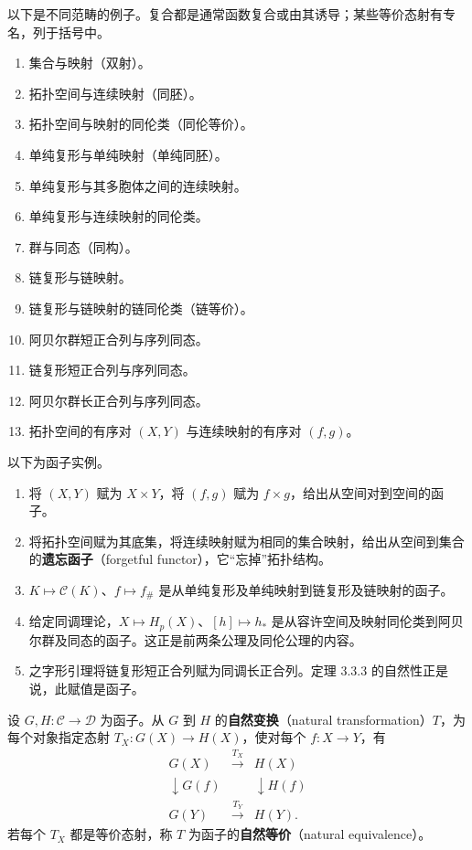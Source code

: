 以下是不同范畴的例子。复合都是通常函数复合或由其诱导；某些等价态射有专名，列于括号中。
\begin{enumerate}[label=(\alph*)]
\item 集合与映射（双射）。
\item 拓扑空间与连续映射（同胚）。
\item 拓扑空间与映射的同伦类（同伦等价）。
\item 单纯复形与单纯映射（单纯同胚）。
\item 单纯复形与其多胞体之间的连续映射。
\item 单纯复形与连续映射的同伦类。
\item 群与同态（同构）。
\item 链复形与链映射。
\item 链复形与链映射的链同伦类（链等价）。
\item 阿贝尔群短正合列与序列同态。
\item 链复形短正合列与序列同态。
\item 阿贝尔群长正合列与序列同态。
\item 拓扑空间的有序对 $(X,Y)$ 与连续映射的有序对 $(f,g)$。
\end{enumerate}

以下为函子实例。
\begin{enumerate}[label=(\alph*)]
\item 将 $(X,Y)$ 赋为 $X\times Y$，将 $(f,g)$ 赋为 $f\times g$，给出从空间对到空间的函子。
\item 将拓扑空间赋为其底集，将连续映射赋为相同的集合映射，给出从空间到集合的\textbf{遗忘函子}（forgetful functor），它“忘掉”拓扑结构。
\item $K\mapsto\mathcal C(K)$、$f\mapsto f_\#$ 是从单纯复形及单纯映射到链复形及链映射的函子。
\item 给定同调理论，$X\mapsto H_p(X)$、$[h]\mapsto h_*$ 是从容许空间及映射同伦类到阿贝尔群及同态的函子。这正是前两条公理及同伦公理的内容。
\item 之字形引理将链复形短正合列赋为同调长正合列。定理 3.3.3 的自然性正是说，此赋值是函子。
\end{enumerate}

设 $G,H:\mathcal C\to\mathcal D$ 为函子。从 $G$ 到 $H$ 的\textbf{自然变换}（natural transformation）$T$，为每个对象指定态射 $T_X:G(X)\to H(X)$，使对每个 $f:X\to Y$，有
\[
\begin{array}{ccc}
G(X)&\xrightarrow{T_X}&H(X)\\
\downarrow\scriptstyle G(f)&&\downarrow\scriptstyle H(f)\\
G(Y)&\xrightarrow{T_Y}&H(Y).
\end{array}
\]
若每个 $T_X$ 都是等价态射，称 $T$ 为函子的\textbf{自然等价}（natural equivalence）。

